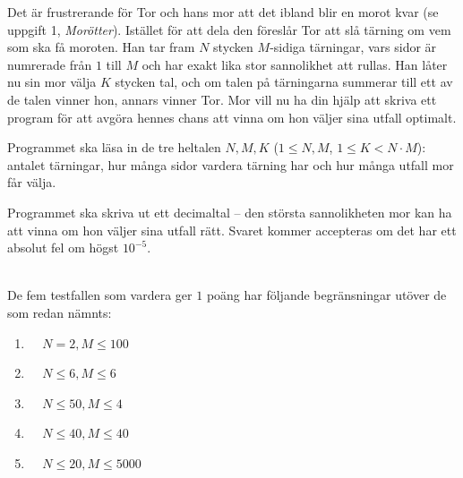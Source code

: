 \newpage
{}

Det är frustrerande för Tor och hans mor att det ibland blir en morot kvar (se uppgift 1, \emph{Morötter}).
Istället för att dela den föreslår Tor att slå tärning om vem som ska få moroten.
Han tar fram $N$ stycken $M$-sidiga tärningar, vars sidor är numrerade från $1$ till $M$ och har exakt lika stor sannolikhet att rullas.
Han låter nu sin mor välja $K$ stycken tal, och om talen på tärningarna summerar till ett av de talen vinner hon, annars vinner Tor.
Mor vill nu ha din hjälp att skriva ett program för att avgöra hennes chans att vinna om hon väljer sina utfall optimalt.





Programmet ska läsa in de tre heltalen $N, M, K$ ($1 \le N, M$, $1 \le K < N \cdot M$): antalet tärningar, hur många sidor vardera tärning har och hur många utfall mor får välja.

Programmet ska skriva ut ett decimaltal -- den största sannolikheten mor kan ha att vinna om hon väljer sina utfall rätt. 
Svaret kommer accepteras om det har ett absolut fel om högst $10^{-5}$.

\\
De fem testfallen som vardera ger $1$ poäng har följande begränsningar utöver de som redan nämnts:
\begin{enumerate}
\item  $\;\;\;\;N=2, M \le 100 $    
\item  $\;\;\;\;N \le 6,  M \le 6 $ 
\item  $\;\;\;\;N \le 50, M \le 4 $   
\item  $\;\;\;\;N \le 40, M \le 40 $   
\item  $\;\;\;\;N \le 20, M \le 5000 $   
\end{enumerate}

